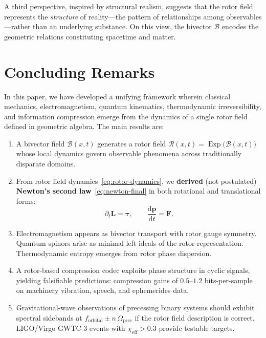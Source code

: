 \documentclass[11pt,a4paper]{article}
\newcommand{\Exp}{\operatorname{Exp}}
\newcommand{\Rotor}{\mathcal{R}}
\newcommand{\Biv}{\mathcal{B}}
\theoremstyle{definition}
\theoremstyle{plain}
\theoremstyle{remark}
\begin{document}
A third perspective, inspired by structural realism, suggests that the rotor field represents the \emph{structure} of reality---the pattern of relationships among observables---rather than an underlying substance. On this view, the bivector $\Biv$ encodes the geometric relations constituting spacetime and matter.

\vspace{1em}

\section{Concluding Remarks}\label{sec:conclusion}

In this paper, we have developed a unifying framework wherein classical mechanics, electromagnetism, quantum kinematics, thermodynamic irreversibility, and information compression emerge from the dynamics of a single rotor field defined in geometric algebra. The main results are:

\begin{enumerate}
  \item A bivector field $\Biv(x,t)$ generates a rotor field $\Rotor(x,t)=\Exp\!\big(\Biv(x,t)\big)$ whose local dynamics govern observable phenomena across traditionally disparate domains.
  \item From rotor field dynamics~\eqref{eq:rotor-dynamics}, we \textbf{derived} (not postulated) \textbf{Newton's second law}~\eqref{eq:newton-final} in both rotational and translational forms:
  \begin{equation*}
  \partial_t \bm{L} = \bm{\tau}, \qquad \frac{\mathrm{d}\mathbf{p}}{\mathrm{d}t} = \mathbf{F}.
  \end{equation*}
  \item Electromagnetism appears as bivector transport with rotor gauge symmetry. Quantum spinors arise as minimal left ideals of the rotor representation. Thermodynamic entropy emerges from rotor phase dispersion.
  \item A rotor-based compression codec exploits phase structure in cyclic signals, yielding falsifiable predictions: compression gains of $0.5$--$1.2$ bits-per-sample on machinery vibration, speech, and ephemerides data.
  \item Gravitational-wave observations of precessing binary systems should exhibit spectral sidebands at $f_{\text{orbital}} \pm n\,\Omega_{\text{prec}}$ if the rotor field description is correct. LIGO/Virgo GWTC-3 events with $\chi_{\text{eff}} > 0.3$ provide testable targets.
\end{enumerate}
\end{document}
